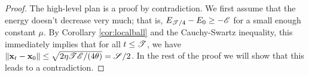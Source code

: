 \begin{proof}
The high-level plan is a proof by contradiction. We first assume that the
energy doesn't decrease very much; that is, $E_{\mathscr{T}/4} - E_0 \ge - \mathscr{E}$ for a small enough constant $\mu$. By Corollary \ref{cor:localball} and the Cauchy-Swartz inequality, this immediately implies that for all $t \le \mathscr{T}$, we have
$\left\|{\mathbf{x}_t - \mathbf{x}_0}\right\| \le \sqrt{2\eta \mathscr{T} \mathscr{E}/(4\theta)} = \mathscr{S}/2$. In
the rest of the proof we will show that this leads to a contradiction.




\end{proof}
